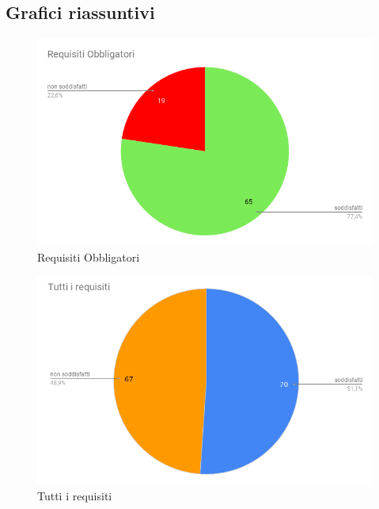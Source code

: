 \subsection{Grafici riassuntivi}
\begin{figure}[H]
\centering
\includegraphics[width=14cm, keepaspectratio]{img/RequisitiObbligatori.png} 
\caption{Requisiti Obbligatori}
\end{figure}
\begin{figure}[H]
\centering
\includegraphics[width=14cm, keepaspectratio]{img/TuttiRequisiti.png} 
\caption{Tutti i requisiti}
\end{figure}